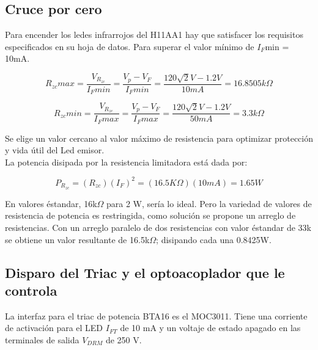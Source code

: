 \subsection{Cruce por cero}

    Para encender los ledes infrarrojos del H11AA1 hay que satisfacer los requisitos especificados en su hoja de datos. Para superar el valor mínimo de $I_F$min = 10mA.
    
    \begin{equation}
        R_{zc}max
        =   \frac{ V_{R_{zc}} }{ I_{F}min }
        =   \frac{ V_{p} - V_{F} }{ I_{F}min }
        =   \frac{ 120 \sqrt{2}V - 1.2V }{ 10mA }
        =   16.8505 k\Omega
    \end{equation}
    
    \begin{equation}
        R_{zc}min
        =   \frac{ V_{R_{zc}} }{ I_{F}max }
        =   \frac{ V_{p} - V_{F} }{ I_{F}max }
        =   \frac{ 120 \sqrt{2}V - 1.2V }{ 50mA }
        =   3.3 k\Omega
    \end{equation}
    
    Se elige un valor cercano al valor máximo de resistencia para optimizar protección y vida útil del Led emisor.\\
    
    La potencia disipada por la resistencia limitadora está dada por:
    
    \begin{equation}
        P_{R_{zc}}   
        =   ( R_{zc} )( I_F )^2 
        =   (  16.5K\Omega )( 10mA )  
        =   1.65W
    \end{equation}
    
    En valores éstandar, 16k$\Omega$ para 2 W, sería lo ideal. Pero la variedad de valores de resistencia de potencia es restringida, como solución se propone un arreglo de resistencias. Con un arreglo paralelo de dos resistencias con valor éstandar de 33k se obtiene un valor resultante de 16.5k$\Omega$; disipando cada una 0.8425W.\\

\subsection{Disparo del Triac y el optoacoplador que le controla}
    La interfaz para el triac de potencia BTA16 es el MOC3011. Tiene una corriente de activación para el LED $I_{FT}$ de 10 mA y un voltaje de estado apagado en las terminales de salida $V_{DRM}$ de 250 V.\\
    
